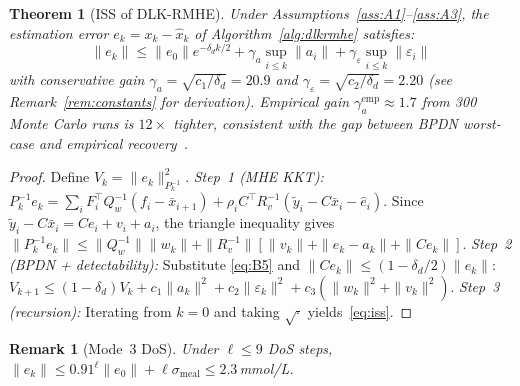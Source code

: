 \documentclass[journal,twoside]{IEEEtran}
\newtheorem{theorem}{Theorem}
\newtheorem{remark}{Remark}
\newcommand{\ehat}{\hat{e}}
\begin{document}
\begin{theorem}[ISS of DLK-RMHE]\label{thm:iss}
Under Assumptions~\ref{ass:A1}--\ref{ass:A3}, the estimation error
$e_k{=}x_k{-}\hat x_k$ of Algorithm~\ref{alg:dlkrmhe} satisfies:
\begin{equation}\label{eq:iss}
  \|e_k\|\leq\|e_0\|e^{-\delta_d k/2}
    +\gamma_a\sup_{i\leq k}\|a_i\|
    +\gamma_\varepsilon\sup_{i\leq k}\|\varepsilon_i\|
\end{equation}
with conservative gain $\gamma_a{=}\sqrt{c_1/\delta_d}{=}20.9$ and
$\gamma_\varepsilon{=}\sqrt{c_2/\delta_d}{=}2.20$ (see Remark~\ref{rem:constants} for derivation).
Empirical gain $\gamma_a^\mathrm{emp}{\approx}1.7$ from 300 Monte Carlo runs is $12\times$ tighter,
consistent with the gap between BPDN worst-case and empirical recovery~\cite{candes2006}.
\end{theorem}

\begin{proof}
Define $V_k{=}\|e_k\|^2_{P_k^{-1}}$.
\emph{Step~1 (MHE KKT):} $P_k^{-1}e_k
  =\sum_i F_i^\top Q_w^{-1}(f_i{-}\bar x_{i+1})
  +\rho_i C^\top R_v^{-1}(\tilde y_i{-}C\bar x_i{-}\hat e_i)$.
Since $\tilde y_i{-}C\bar x_i=Ce_i+v_i+a_i$, the triangle inequality gives
$\|P_k^{-1}e_k\|\leq\|Q_w^{-1}\|\|w_k\|
  +\|R_v^{-1}\|[\|v_k\|+\|\ehat_k{-}a_k\|+\|Ce_k\|]$.
\emph{Step~2 (BPDN + detectability):}
Substitute \eqref{eq:B5} and $\|Ce_k\|\leq(1{-}\delta_d/2)\|e_k\|$:
$V_{k+1}\leq(1{-}\delta_d)V_k+c_1\|a_k\|^2+c_2\|\varepsilon_k\|^2+c_3(\|w_k\|^2+\|v_k\|^2)$.
\emph{Step~3 (recursion):} Iterating from $k{=}0$ and taking $\sqrt{\cdot}$
yields~\eqref{eq:iss}.
\end{proof}

\begin{remark}[Mode~3 DoS]
Under $\ell\leq9$ DoS steps, $\|e_k\|\leq0.91^\ell\|e_0\|+\ell\sigma_\mathrm{meal}\leq2.3$\,mmol/L.
\end{remark}
\end{document}
